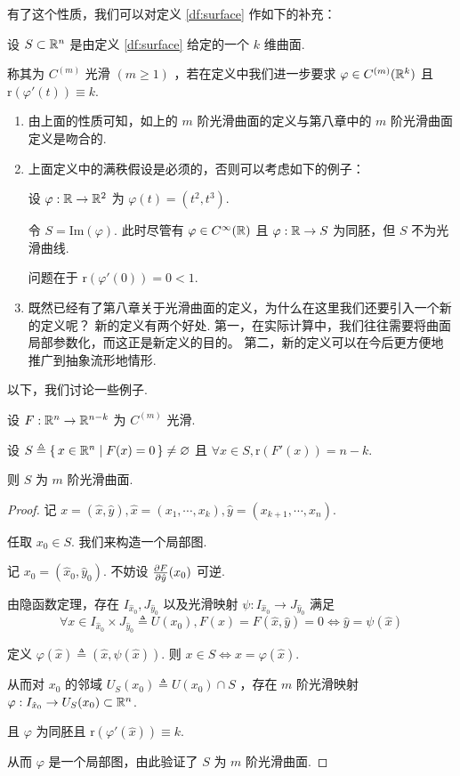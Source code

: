 有了这个性质，我们可以对定义 \ref{df:surface} 作如下的补充：

\begin{definition}
设 $S\subset\mathbb{R}^n$ 是由定义 \textup{\ref{df:surface}} 给定的一个 $k$ 维曲面.

称其为 $C^{(m)}$ 光滑 $(m\ge 1)$ ，若在定义中我们进一步要求 $\varphi\in C^{(m)}(\mathbb{R}^k)$ 且 $\mathrm{r}(\varphi'(t))\equiv k$.
\end{definition}

\begin{hint}
\begin{enumerate}
    \item 由上面的性质可知，如上的 $m$ 阶光滑曲面的定义与第八章中的 $m$ 阶光滑曲面定义是吻合的.

    \item 上面定义中的满秩假设是必须的，否则可以考虑如下的例子：
    
设 $\varphi:\mathbb{R}\to\mathbb{R}^2$ 为 $\varphi(t)=(t^2,t^3)$.

令 $S=\mathrm{Im}(\varphi)$. 此时尽管有 $\varphi\in C^{\infty}(\mathbb{R})$ 且 $\varphi:\mathbb{R}\to S$ 为同胚，但 $S$ 不为光滑曲线.


问题在于 $\mathrm{r}(\varphi'(0))=0<1$.

    \item 既然已经有了第八章关于光滑曲面的定义，为什么在这里我们还要引入一个新的定义呢？
    新的定义有两个好处. 第一，在实际计算中，我们往往需要将曲面局部参数化，而这正是新定义的目的。
    第二，新的定义可以在今后更方便地推广到抽象流形地情形.
\end{enumerate}
\end{hint}

以下，我们讨论一些例子.

\begin{example}
设 $F:\mathbb{R}^n\to\mathbb{R}^{n-k}$ 为 $C^{(m)}$ 光滑.

设 $S\triangleq\set{x\in\mathbb{R}^n|F(x)=0}\ne\varnothing$ 且 $\forall x\in S,\mathrm{r}(F'(x))=n-k$.

则 $S$ 为 $m$ 阶光滑曲面.
\end{example}
\begin{proof}
记 $x=(\hat{x},\hat{y}),\hat{x}=(x_1,\cdots,x_k),\hat{y}=(x_{k+1},\cdots,x_n)$.

任取 $x_0\in S$. 我们来构造一个局部图.

记 $x_0=(\hat{x}_0,\hat{y}_0)$. 不妨设 $\frac{\partial{F}}{\partial{\hat{y}}}(x_0)$ 可逆.

由隐函数定理，存在 $I_{\hat{x}_0},J_{\hat{y}_0}$ 以及光滑映射 $\psi:I_{\hat{x}_0}\to J_{\hat{y}_0}$ 满足
$$
\forall x\in I_{\hat{x}_0}\times J_{\hat{y}_0}\triangleq U(x_0),F(x)=F(\hat{x},\hat{y})=0\iff\hat{y}=\psi(\hat{x})
$$

定义 $\varphi(\hat{x})\triangleq(\hat{x},\psi(\hat{x}))$. 则 $x\in S\iff x=\varphi(\hat{x})$.

从而对 $x_0$ 的邻域 $U_S(x_0)\triangleq U(x_0)\cap S$ ，存在 $m$ 阶光滑映射 $\varphi:I_{\hat{x}_0}\to U_S(x_0)\subset\mathbb{R}^n$.

且 $\varphi$ 为同胚且 $\mathrm{r}(\varphi'(\hat{x}))\equiv k$.

从而 $\varphi$ 是一个局部图，由此验证了 $S$ 为 $m$ 阶光滑曲面.
\end{proof}

